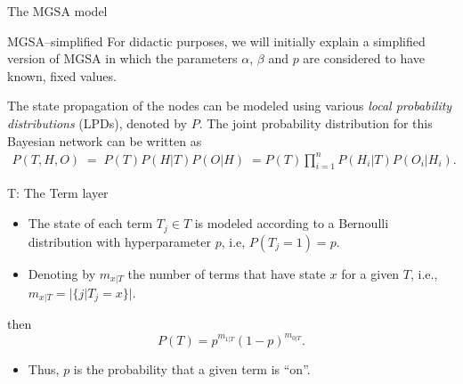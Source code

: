 \documentclass{beamer}
\newcommand{\numberofterms}[2][|T]{m_{#2#1}}
\begin{document}
 
 \begin{frame}{The MGSA model}
  \begin{mybluebox}{MGSA--simplified}
   For didactic purposes, we will initially explain a simplified version
of MGSA in which the parameters $\alpha$, $\beta$ and $p$ are considered to
have known, fixed values.
  \end{mybluebox}



The state propagation of the nodes can be modeled using various \emph{local
probability distributions} (LPDs), denoted by $P$. The joint probability
distribution for this Bayesian network can be written as
\begin{multline}
  P(T,H,O) \; = \; P(T)P(H|T)P(O|H)\;  = P(T)\prod_{i=1}^n
  P(H_i|T) P(O_i|H_i).
\label{eqn:joint.general}
\end{multline}
 \end{frame}
 
\begin{frame}{T: The Term layer}

\begin{itemize}
 \item  The state of each term $T_j\in T$ is modeled according to a Bernoulli
distribution with hyperparameter $p$, i.e, $P(T_j=1)=p$. 
\item Denoting by
$\numberofterms{x}$ the number of terms that have state $x$ for a given $T$,
i.e., $\numberofterms{x}=|\{j|T_j=x\}|$. 
\end{itemize}

then
\begin{equation}
 P(T) = p^{\numberofterms{1}}(1-p)^{\numberofterms{0}}.
\label{eqn:prior}
\end{equation}
\begin{itemize}
 \item Thus, $p$ is the probability that a given term is ``on''.
\end{itemize}


\end{frame}
\end{document}
